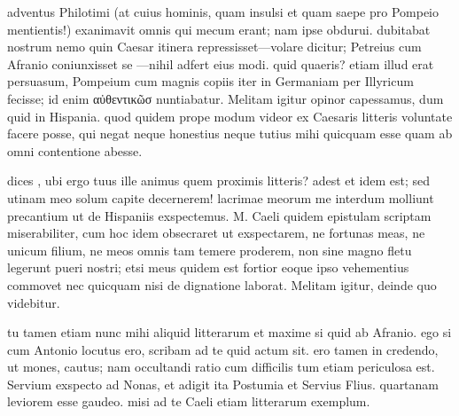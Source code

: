 


 adventus Philotimi (at cuius hominis, quam insulsi et quam saepe pro Pompeio mentientis!) exanimavit omnis qui mecum erant; nam ipse obdurui. dubitabat nostrum nemo quin Caesar itinera repressisset—volare dicitur; Petreius cum Afranio coniunxisset se —nihil adfert eius modi. quid quaeris? etiam illud erat persuasum, Pompeium cum magnis copiis iter in Germaniam per Illyricum fecisse; id enim αὐθεντικῶσ nuntiabatur. Melitam igitur opinor capessamus, dum quid in Hispania. quod quidem prope modum videor ex Caesaris litteris voluntate facere posse, qui negat neque honestius neque tutius mihi quicquam esse quam ab omni contentione abesse.

 dices , ubi ergo tuus ille animus quem proximis litteris? adest et idem est; sed utinam meo solum capite decernerem! lacrimae meorum me interdum molliunt precantium ut de Hispaniis exspectemus. M. Caeli quidem epistulam scriptam miserabiliter, cum hoc idem obsecraret ut exspectarem, ne fortunas meas, ne unicum filium, ne meos omnis tam temere proderem, non sine magno fletu legerunt pueri nostri; etsi meus quidem est fortior eoque ipso vehementius commovet nec quicquam nisi de dignatione laborat. Melitam igitur, deinde quo videbitur.

 tu tamen etiam nunc mihi aliquid litterarum et maxime si quid ab Afranio. ego si cum Antonio locutus ero, scribam ad te quid actum sit. ero tamen in credendo, ut mones, cautus; nam occultandi ratio cum difficilis tum etiam periculosa est. Servium exspecto ad Nonas, et adigit ita Postumia et Servius Flius. quartanam leviorem esse gaudeo. misi ad te Caeli etiam litterarum exemplum.

